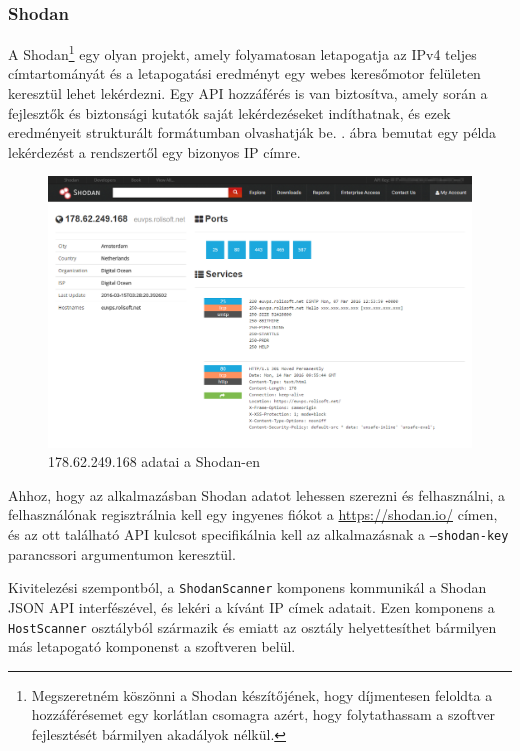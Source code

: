 \subsubsection*{Shodan} \label{ssec:shodan}

	A Shodan\footnote{Megszeretném köszönni a Shodan készítőjének, hogy díjmentesen feloldta a hozzáférésemet egy korlátlan csomagra azért, hogy folytathassam a szoftver fejlesztését bármilyen akadályok nélkül.}\cite{shodan16} egy olyan projekt, amely folyamatosan letapogatja az IPv4 teljes címtartományát és a letapogatási eredményt egy webes keresőmotor felületen keresztül lehet lekérdezni. Egy API hozzáférés is van biztosítva, amely során a fejlesztők és biztonsági kutatók saját lekérdezéseket indíthatnak, és ezek eredményeit strukturált formátumban olvashatják be. \Az{\ref{shodanscr}}. ábra bemutat egy példa lekérdezést a rendszertől egy bizonyos IP címre.

	\begin{figure}[!htbp]
		\centering
		\includegraphics[scale=0.355]{shodan.png}
		\caption{178.62.249.168 adatai a Shodan-en}
		\label{shodanscr}
	\end{figure}
	
	Ahhoz, hogy az alkalmazásban Shodan adatot lehessen szerezni és felhasználni, a felhasználónak regisztrálnia kell egy ingyenes fiókot a \url{https://shodan.io/} címen, és az ott található API kulcsot specifikálnia kell az alkalmazásnak a \texttt{--shodan-key} parancssori argumentumon keresztül.
	
	Kivitelezési szempontból, a \texttt{ShodanScanner} komponens kommunikál a Shodan JSON API interfészével, és lekéri a kívánt IP címek adatait. Ezen komponens a \texttt{HostScanner} osztályból származik és emiatt az osztály helyettesíthet bármilyen más letapogató komponenst a szoftveren belül.


